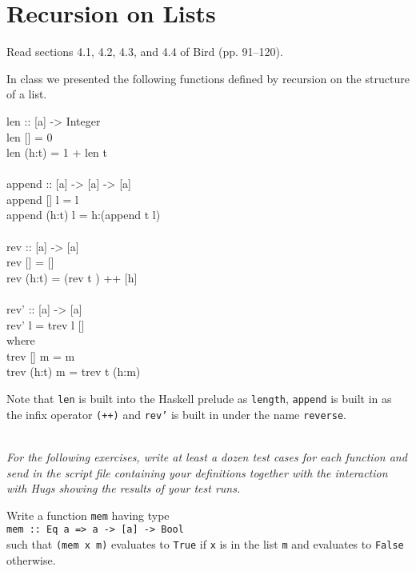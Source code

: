 \documentclass[11pt]{article}
\begin{document}

\section{Recursion on Lists}

\begin{exercise}
Read sections 4.1, 4.2, 4.3, and 4.4 of Bird (pp. 91--120).
\end{exercise}




In class we presented the following functions defined by recursion on the structure of a list.

\begin{program*}
\>  len :: [a] -> Integer   \\
\>  len [] = 0   \\
\>  len (h:t) = 1 + len t   \\
\>     \\
\>  append :: [a] -> [a] -> [a]   \\
\>  append [] l = l   \\
\>  append (h:t) l = h:(append t l)   \\
\>     \\
\>  rev :: [a] -> [a]    \\
\>  rev [] = []   \\
\>  rev (h:t) =  (rev t ) ++  [h]   \\
\>     \\
\>  rev' :: [a]  -> [a]   \\
\>  rev' l = trev l []    \\
\>     where   \\
\>       trev [] m = m    \\
\>       trev (h:t) m = trev t (h:m)   \\
\end{program*}

\noindent{}Note that {\tt{len}} is built into the Haskell prelude as
{\tt{length}}, {\tt{append}} is built in as the infix operator {\tt{(++)}} and
{\tt{rev'}} is built in under the name {\tt{reverse}}.

\ \\
{\it
For the following exercises, write at least a dozen test cases for each
function and send in the script file containing your definitions together with
the interaction with Hugs showing the results of your test runs.
}


\begin{exercise}
Write a function {\tt{mem}} having type \\{\mbox{\hspace{.25in}}}{\tt{mem :: Eq
a => a -> [a] -> Bool}}\\ such that {\tt{(mem x m)}} evaluates to {\tt{True}}
if {\tt{x}} is in the list {\tt{m}} and evaluates to {\tt{False}} otherwise.
\end{exercise}
\end{document}
